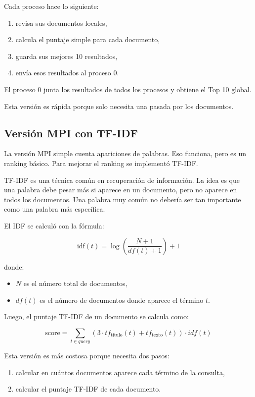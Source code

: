 \documentclass[12pt,letterpaper]{article}
\begin{document}
Cada proceso hace lo siguiente:

\begin{enumerate}
\item revisa sus documentos locales,
\item calcula el puntaje simple para cada documento,
\item guarda sus mejores 10 resultados,
\item envía esos resultados al proceso 0.
\end{enumerate}

El proceso 0 junta los resultados de todos los procesos y obtiene el Top 10 global.

Esta versión es rápida porque solo necesita una pasada por los documentos.

\subsection{Versión MPI con TF-IDF}

La versión MPI simple cuenta apariciones de palabras. Eso funciona, pero es un ranking básico. Para mejorar el ranking se implementó TF-IDF.

TF-IDF es una técnica común en recuperación de información. La idea es que una palabra debe pesar más si aparece en un documento, pero no aparece en todos los documentos. Una palabra muy común no debería ser tan importante como una palabra más específica.

El IDF se calculó con la fórmula:

\[
\text{idf}(t) = \log\left(\frac{N + 1}{df(t) + 1}\right) + 1
\]

donde:

\begin{itemize}
\item $N$ es el número total de documentos,
\item $df(t)$ es el número de documentos donde aparece el término $t$.
\end{itemize}

Luego, el puntaje TF-IDF de un documento se calcula como:

\[
\text{score} = \sum_{t \in query}
\left(3 \cdot tf_{\text{titulo}}(t) + tf_{\text{texto}}(t)\right)
\cdot idf(t)
\]

Esta versión es más costosa porque necesita dos pasos:

\begin{enumerate}
\item calcular en cuántos documentos aparece cada término de la consulta,
\item calcular el puntaje TF-IDF de cada documento.
\end{enumerate}
\end{document}
